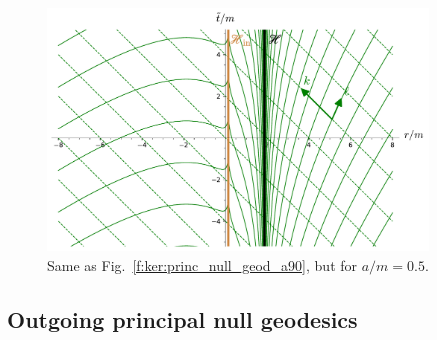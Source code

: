 \begin{figure}
\centerline{\includegraphics[width=0.9\textwidth]{ker_princ_null_geod_a50.pdf}}
\caption[]{\label{f:ker:princ_null_geod_a50} \footnotesize
Same as Fig.~\ref{f:ker:princ_null_geod_a90}, but for $a/m=0.5$.}
\end{figure}



\subsection{Outgoing principal null geodesics} \label{s:ker:out_princ_null_geod}

